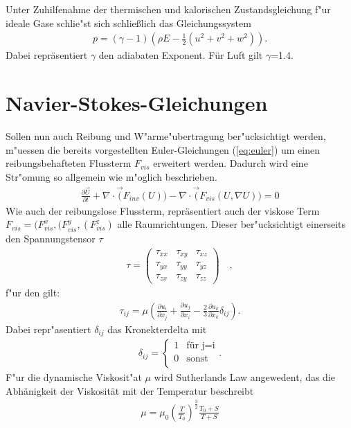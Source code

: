 Unter Zuhilfenahme der thermischen und kalorischen Zustandsgleichung f"ur ideale Gase schlie"st sich schließlich das Gleichungssystem
\begin{gather}
p = (\gamma -1)(\rho E - \frac{1}{2}(u^{2}+v^{2}+w^{2})).
\end{gather}
Dabei repräsentiert $\gamma$ den adiabaten Exponent. Für Luft gilt $\gamma$=1.4.

\section{Navier-Stokes-Gleichungen}
Sollen nun auch Reibung und W"arme"ubertragung ber"ucksichtigt werden, m"uessen die bereits vorgestellten Euler-Gleichungen (\ref{eq:euler}) um einen reibungsbehafteten Flussterm $F_{vis}$ erweitert werden. Dadurch wird eine Str"omung so allgemein wie m"oglich beschrieben.
\begin{gather}\label{eq:ns}
	\frac{\partial\vec{U}}{\partial t} + \nabla \cdot \vec(F_{inv}(U)) -  \nabla \cdot \vec(F_{vis}(U, \nabla U))= 0
\end{gather}
Wie auch der reibungslose Flussterm, repräsentiert auch der viskose Term $F_{vis}=(F^{x}_{vis}, (F^{y}_{vis}, (F^{z}_{vis})$ alle Raumrichtungen. Dieser ber"ucksichtigt einerseits den Spannungstensor $\tau$
\begin{gather}
	\tau=\begin{pmatrix} 
	\tau_{xx} & \tau_{xy} & \tau_{xz}\\
	\tau_{yx} & \tau_{yy} & \tau_{yz}\\
	\tau_{zx} & \tau_{zy} & \tau_{zz}
	\end{pmatrix}
	\quad,
\end{gather}
f"ur den gilt:
\begin{gather}
	\tau_{ij}=\mu \left(\frac{\partial u_{i}}{\partial x_{j}} +\frac{\partial u_{j}}{\partial x_{i}} - \frac{2}{3}\frac{\partial u_{k}}{\partial x_{k}}\delta_{ij} \right) .
\end{gather}
Dabei repr"asentiert $\delta_{ij}$ das Kronekterdelta mit
\begin{gather}
	\delta_{ij}=\begin{cases} 
	1 & \text{für j=i}\\
	0 & \text{sonst}\\
	\end{cases}.
\end{gather}
F"ur die dynamische Viskosit"at $\mu$ wird Sutherlands Law angewedent, das die Abhänigkeit der Viskosität mit der Temperatur beschreibt
\begin{gather}
	\mu = \mu_{0} \left(\frac{T}{T_{0}}\right)^\frac{3}{2} \frac{T_{0}+S}{T+S}
\end{gather}

